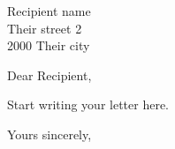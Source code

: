 \documentclass[11pt]{letter}
\date{\today}
\begin{document}
\begin{letter}{Recipient name \\ Their street 2 \\ 2000 Their city}

\opening{Dear Recipient,}

Start writing your letter here.

\closing{Yours sincerely,}

\end{letter}
\end{document}
